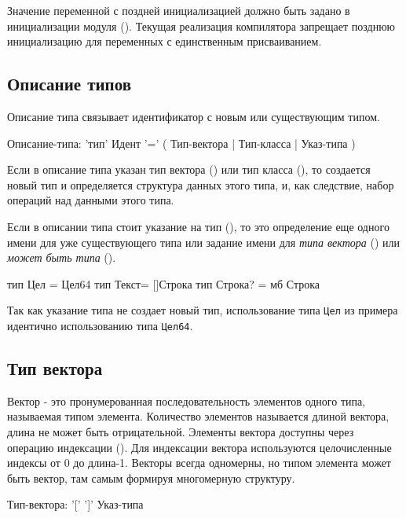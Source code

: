 Значение переменной с поздней инициализацией должно быть задано в инициализации модуля (). 
Текущая реализация компилятора запрещает позднюю инициализацию для переменных с единственным присваиванием.

\hypertarget{types}{%
\subsection{Описание типов}\label{decls:types}}

Описание типа связывает идентификатор с новым или существующим типом.

\begin{Grammar}
Описание-типа: 
    'тип' Идент '=' 
    ( Тип-вектора 
    | Тип-класса
    | Указ-типа
    )
\end{Grammar} 

Если в описание типа указан тип вектора () или тип класса (), то создается новый тип и определяется структура данных этого типа, и, как следствие, набор операций над данными этого типа.

Если в описании типа стоит указание на тип (), 
то это определение еще одного имени для уже существующего типа 
или задание имени для \emph{типа вектора} () или \emph{может быть типа} (). 

\begin{Trivil}
тип Цел = Цел64
тип Текст= []Строка
тип Строка? = мб Строка
\end{Trivil}

Так как указание типа не создает новый тип, использование типа \verb+Цел+ из примера идентично использованию типа \verb+Цел64+.

\hypertarget{vector-types}{%
\subsection{Тип вектора}\label{decls:vector-types}}

Вектор - это пронумерованная последовательность элементов одного типа, называемая типом элемента. Количество элементов называется длиной вектора, длина не может быть отрицательной. Элементы вектора доступны через операцию индексации (). Для индексации вектора используются целочисленные индексы  от 0 до длина-1. Векторы всегда одномерны, но типом элемента может быть вектор, там самым формируя многомерную структуру.

\begin{Grammar}
Тип-вектора: '[' ']'  Указ-типа
\end{Grammar} 

